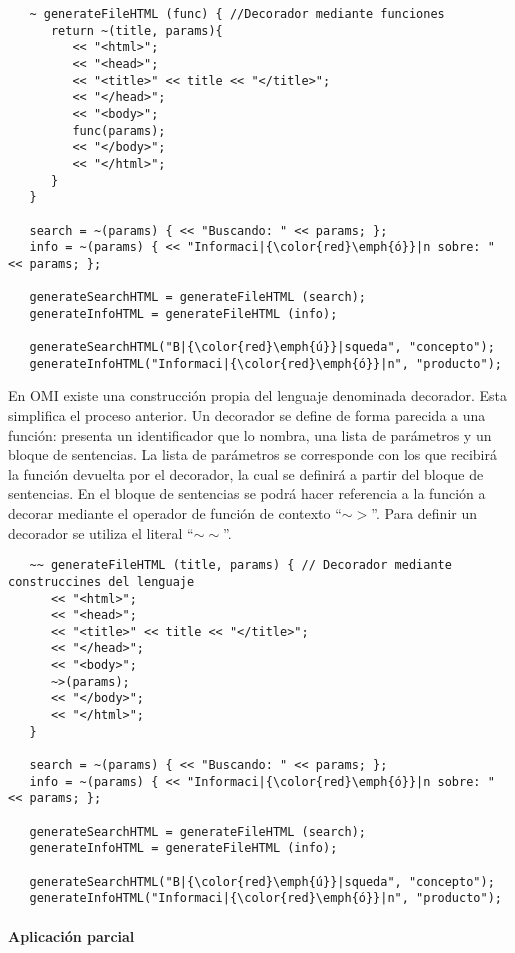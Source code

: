 \begin{lstlisting}
   ~ generateFileHTML (func) { //Decorador mediante funciones
      return ~(title, params){
         << "<html>";
         << "<head>";
         << "<title>" << title << "</title>";
         << "</head>";
         << "<body>";
         func(params);
         << "</body>";
         << "</html>";
      }
   }
   
   search = ~(params) { << "Buscando: " << params; };
   info = ~(params) { << "Informaci|{\color{red}\emph{ó}}|n sobre: " << params; };
   
   generateSearchHTML = generateFileHTML (search);
   generateInfoHTML = generateFileHTML (info);
   
   generateSearchHTML("B|{\color{red}\emph{ú}}|squeda", "concepto");
   generateInfoHTML("Informaci|{\color{red}\emph{ó}}|n", "producto");
\end{lstlisting}

En OMI existe una construcción propia del lenguaje denominada decorador. Esta simplifica el 
proceso anterior. Un decorador se define de forma parecida a una función: presenta un identificador 
que lo nombra, una lista de parámetros y un bloque de sentencias. La lista de parámetros se corresponde 
con los que recibirá la función devuelta por el decorador, la cual se definirá a partir del 
bloque de sentencias. En el bloque de sentencias se podrá hacer referencia a la función a 
decorar mediante el operador de función de contexto ``$\sim>$''. Para definir un decorador se utiliza
el literal ``$\sim\sim$''. \\

\begin{lstlisting}
   ~~ generateFileHTML (title, params) { // Decorador mediante construccines del lenguaje
      << "<html>";
      << "<head>";
      << "<title>" << title << "</title>";
      << "</head>";
      << "<body>";
      ~>(params);
      << "</body>";
      << "</html>";
   }
   
   search = ~(params) { << "Buscando: " << params; };
   info = ~(params) { << "Informaci|{\color{red}\emph{ó}}|n sobre: " << params; };
   
   generateSearchHTML = generateFileHTML (search);
   generateInfoHTML = generateFileHTML (info);
   
   generateSearchHTML("B|{\color{red}\emph{ú}}|squeda", "concepto");
   generateInfoHTML("Informaci|{\color{red}\emph{ó}}|n", "producto");
\end{lstlisting}
\paragraph{Aplicación parcial}

